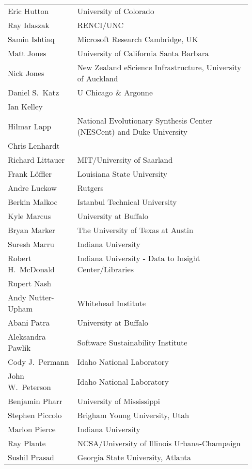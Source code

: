 \documentclass[11pt, oneside]{amsart}
\begin{document}
{\begin{longtable}{ll}
\\ Eric Hutton           &  University of Colorado
\\ Ray Idaszak           &  RENCI/UNC
\\ Samin Ishtiaq         &  Microsoft Research Cambridge, UK
\\ Matt Jones            &  University of California Santa Barbara
\\ Nick Jones            &  New Zealand eScience Infrastructure, University of Auckland
\\ Daniel S.~Katz        &  U Chicago \& Argonne
\\ Ian Kelley
\\ Hilmar Lapp           &  National Evolutionary Synthesis Center (NESCent) and Duke University
\\ Chris Lenhardt
\\ Richard Littauer      &  MIT/University of Saarland
\\ Frank L\"{o}ffler     &  Louisiana State University
\\ Andre Luckow          &  Rutgers
\\ Berkin Malkoc         &  Istanbul Technical University
\\ Kyle Marcus           &  University at Buffalo
\\ Bryan Marker          &  The University of Texas at Austin
\\ Suresh Marru          &  Indiana University
\\ Robert H.~McDonald    &  Indiana University - Data to Insight Center/Libraries
\\ Rupert Nash
\\ Andy Nutter-Upham     &  Whitehead Institute
\\ Abani Patra           &  University at Buffalo
\\ Aleksandra Pawlik     &  Software Sustainability Institute
\\ Cody J.~Permann       &  Idaho National Laboratory
\\ John W.~Peterson      &  Idaho National Laboratory
\\ Benjamin Pharr        &  University of Mississippi
\\ Stephen Piccolo       &  Brigham Young University, Utah
\\ Marlon Pierce         &  Indiana University
\\ Ray Plante            &  NCSA/University of Illinois Urbana-Champaign
\\ Sushil Prasad         &  Georgia State University, Atlanta

\end{longtable}}
\end{document}
